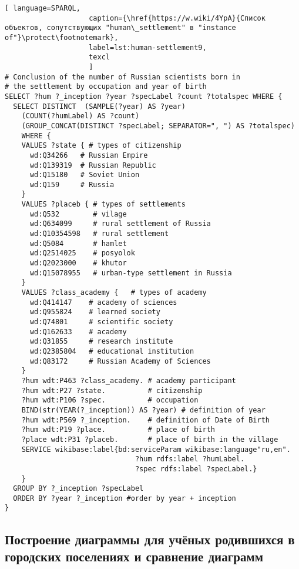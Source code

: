 \lstset{numbers=left, firstnumber=1, frame=single}
\begin{lstlisting}[ language=SPARQL, 
                    caption={\href{https://w.wiki/4YpA}{Cписок объектов, сопутствующих "human\_settlement" в "instance of"}\protect\footnotemark},
                    label=lst:human-settlement9,
                    texcl 
                    ]
# Conclusion of the number of Russian scientists born in 
# the settlement by occupation and year of birth
SELECT ?hum ?_inception ?year ?specLabel ?count ?totalspec WHERE {
  SELECT DISTINCT  (SAMPLE(?year) AS ?year) 
	(COUNT(?humLabel) AS ?count)  
	(GROUP_CONCAT(DISTINCT ?specLabel; SEPARATOR=", ") AS ?totalspec) 
	WHERE {
    VALUES ?state { # types of citizenship
      wd:Q34266   # Russian Empire 
      wd:Q139319  # Russian Republic
      wd:Q15180   # Soviet Union
      wd:Q159     # Russia
    }
    VALUES ?placeb { # types of settlements
      wd:Q532        # vilage
      wd:Q634099     # rural settlement of Russia
      wd:Q10354598   # rural settlement
      wd:Q5084       # hamlet
      wd:Q2514025    # posyolok
      wd:Q2023000    # khutor
      wd:Q15078955   # urban-type settlement in Russia
    }
    VALUES ?class_academy {   # types of academy
      wd:Q414147    # academy of sciences 
      wd:Q955824    # learned society
      wd:Q74801     # scientific society
      wd:Q162633    # academy
      wd:Q31855     # research institute
      wd:Q2385804   # educational institution
      wd:Q83172     # Russian Academy of Sciences
    }
    ?hum wdt:P463 ?class_academy. # academy participant
    ?hum wdt:P27 ?state.          # citizenship
    ?hum wdt:P106 ?spec.          # occupation
    BIND(str(YEAR(?_inception)) AS ?year) # definition of year
    ?hum wdt:P569 ?_inception.    # definition of Date of Birth
    ?hum wdt:P19 ?place.          # place of birth
    ?place wdt:P31 ?placeb.       # place of birth in the village
    SERVICE wikibase:label{bd:serviceParam wikibase:language"ru,en".
                               ?hum rdfs:label ?humLabel.
                               ?spec rdfs:label ?specLabel.}
    }
  GROUP BY ?_inception ?specLabel
  ORDER BY ?year ?_inception #order by year + inception
}
\end{lstlisting}%

\subsection{Построение диаграммы для учёных родившихся в городских поселениях и сравнение диаграмм}

